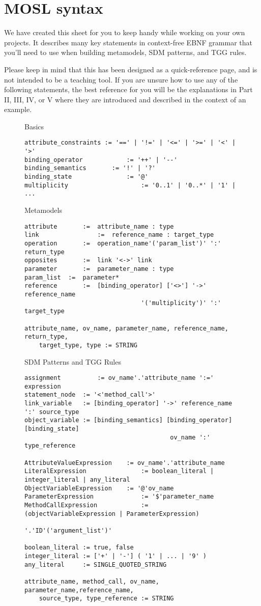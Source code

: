 \newpage
\section{MOSL syntax}
\texHeader

We have created this sheet for you to keep handy while working on your own projects. It describes many key statements in context-free EBNF grammar that you'll
need to use when building metamodels, SDM patterns, and TGG rules.

Please keep in mind that this has been designed as a quick-reference page, and is not intended to be a teaching tool. If you are unsure how to use any
of the following statements, the best reference for you will be the explanations in Part II, III, IV, or V where they are introduced and described in the
context of an example.

\begin{figure}[htbp]
Basics
\begin{lstlisting}[backgroundcolor=\color{codelightgray}]
attribute_constraints := '==' | '!=' | '<=' | '>=' | '<' | '>'
binding_operator 			:= '++' | '--'
binding_semantics 		:= '!' | '?'
binding_state 				:= '@'
multiplicity 					:= '0..1' | '0..*' | '1' | ...
\end{lstlisting}

Metamodels
\begin{lstlisting}[backgroundcolor=\color{codelightgray}]
attribute		:=	attribute_name : type
link				:=	reference_name : target_type
operation		:=	operation_name'('param_list')' ':' return_type
opposites		:=	link '<->' link
parameter		:=	parameter_name : type
param_list	:=	parameter*
reference		:=	[binding_operator] ['<>'] '->' reference_name 
								'('multiplicity')' ':' target_type

attribute_name, ov_name, parameter_name, reference_name, return_type, 
	target_type, type := STRING
\end{lstlisting}

SDM Patterns and TGG Rules
\begin{lstlisting}[backgroundcolor=\color{codelightgray}]
assignment			:= ov_name'.'attribute_name ':=' expression
statement_node	:= '<'method_call'>'
link_variable 	:= [binding_operator] '->' reference_name ':' source_type
object_variable := [binding_semantics] [binding_operator] [binding_state] 
										ov_name ':' type_reference
										
AttributeValueExpression 	:= ov_name'.'attribute_name
LiteralExpression 				:= boolean_literal | integer_literal | any_literal
ObjectVariableExpression 	:= '@'ov_name
ParameterExpression 			:= '$'parameter_name
MethodCallExpression 			:= (objectVariableExpression | ParameterExpression)
															'.'ID'('argument_list')'

boolean_literal := true, false
integer_literal := ['+' | '-'] ( '1' | ... | '9' )
any_literal	    := SINGLE_QUOTED_STRING

attribute_name, method_call, ov_name, parameter_name,reference_name, 
	source_type, type_reference := STRING
\end{lstlisting}
\end{figure}
